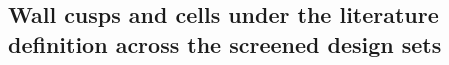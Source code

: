 %
%
\subsection{Wall cusps and cells under the literature definition across the screened design sets}
\label{sec:cusp-topology-v3-1}

